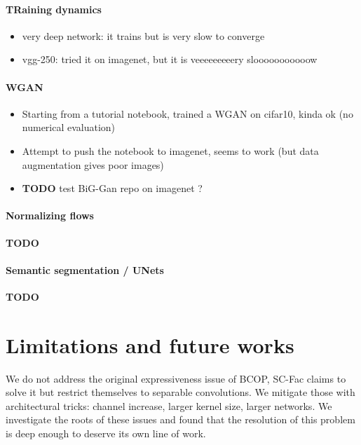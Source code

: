 \paragraph{TRaining dynamics}

\begin{itemize}
    \item very deep network: it trains but is very slow to converge
    \item vgg-250: tried it on imagenet, but it is veeeeeeeeery slooooooooooow
\end{itemize}

\paragraph{WGAN}

\begin{itemize}
    \item Starting from a tutorial notebook, trained a WGAN on cifar10, kinda ok (no numerical evaluation)
    \item Attempt to push the notebook to imagenet, seems to work (but data augmentation gives poor images)
    \item \textbf{TODO} test BiG-Gan repo on imagenet ?
\end{itemize}

\paragraph{Normalizing flows}

\textbf{TODO}

\paragraph{Semantic segmentation / UNets}

\textbf{TODO}


\section{Limitations and future works}

    We do not address the original expressiveness issue of BCOP, SC-Fac claims to solve it but restrict themselves to separable convolutions. We mitigate those with architectural tricks: channel increase, larger kernel size, larger networks.
    We investigate the roots of these issues and found that the resolution of this problem is deep enough to deserve its own line of work.


